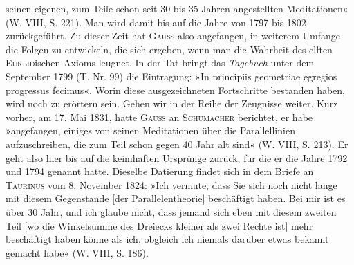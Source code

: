 seinen eigenen, zum Teile schon seit 30 bis 35 Jahren angestellten Meditationen«
(W. VIII, S. 221). Man wird damit bis auf die Jahre von 1797 bis
1802 zurückgeführt. Zu dieser Zeit hat \textsc{Gauss} also angefangen, in weiterem
Umfange die Folgen zu entwickeln, die sich ergeben, wenn man die Wahrheit
des elften \textsc{Euklid}ischen Axioms leugnet. In der Tat bringt das \textit{Tagebuch}
unter dem September 1799 (T. Nr. 99) die Eintragung: »In principiis geometriae
egregios progressus fecimus«. Worin diese ausgezeichneten Fortschritte
bestanden haben, wird noch zu erörtern sein.
\clearpage{}
\noindent\hspace*{\parindent}Gehen wir in der Reihe der Zeugnisse weiter. Kurz vorher, am 17. Mai
1831, hatte \textsc{Gauss} an \textsc{Schumacher} berichtet, er habe »angefangen, einiges von
seinen Meditationen über die Parallellinien aufzuschreiben, die zum Teil schon
gegen 40 Jahr alt sind« (W. VIII, S. 213). Er geht also hier bis auf die
keimhaften Ursprünge zurück, für die er die Jahre 1792 und 1794 genannt
hatte. Dieselbe Datierung findet sich in dem Briefe an \textsc{Taurinus} vom 8. November
1824: »Ich vermute, dass Sie sich noch nicht lange mit diesem Gegenstande
[der Parallelentheorie] beschäftigt haben. Bei mir ist es über 30 Jahr,
und ich glaube nicht, dass jemand sich eben mit diesem zweiten Teil [wo die
Winkelsumme des Dreiecks kleiner als zwei Rechte ist] mehr beschäftigt haben
könne als ich, obgleich ich niemals darüber etwas bekannt gemacht habe«
(W. VIII, S. 186).
\clearpage\endgroup
